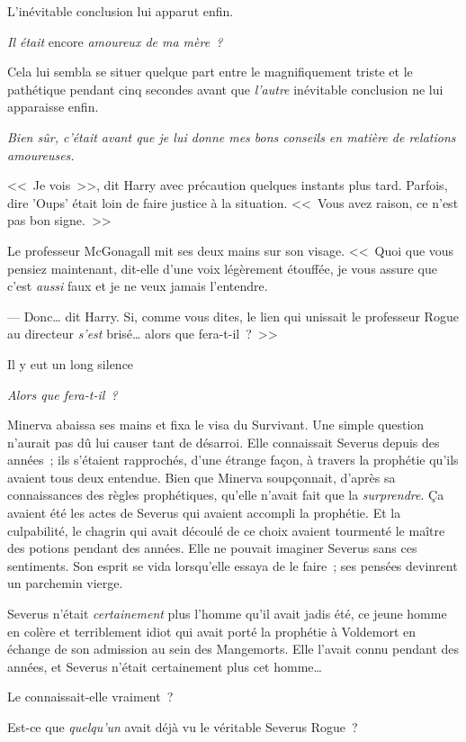L'inévitable conclusion lui apparut enfin.

\emph{Il était} encore \emph{amoureux de ma mère~?}

Cela lui sembla se situer quelque part entre le magnifiquement triste et le pathétique pendant cinq secondes avant que \emph{l'autre} inévitable conclusion ne lui apparaisse enfin.

\emph{Bien sûr, c'était avant que je lui donne mes bons conseils en matière de relations amoureuses.}

<<~Je vois~>>, dit Harry avec précaution quelques instants plus tard. Parfois, dire 'Oups' était loin de faire justice à la situation. <<~Vous avez raison, ce n'est pas bon signe.~>>

Le professeur McGonagall mit ses deux mains sur son visage. <<~Quoi que vous pensiez maintenant, dit-elle d'une voix légèrement étouffée, je vous assure que c'est \emph{aussi} faux et je ne veux jamais l'entendre.

--- Donc… dit Harry. Si, comme vous dites, le lien qui unissait le professeur Rogue au directeur \emph{s'est} brisé… alors que fera-t-il~?~>>

Il y eut un long silence

\later

\emph{Alors que fera-t-il~?}

Minerva abaissa ses mains et fixa le visa du Survivant. Une simple question n'aurait pas dû lui causer tant de désarroi. Elle connaissait Severus depuis des années~; ils s'étaient rapprochés, d'une étrange façon, à travers la prophétie qu'ils avaient tous deux entendue. Bien que Minerva soupçonnait, d'après sa connaissances des règles prophétiques, qu'elle n'avait fait que la \emph{surprendre}. Ça avaient été les actes de Severus qui avaient accompli la prophétie. Et la culpabilité, le chagrin qui avait découlé de ce choix avaient tourmenté le maître des potions pendant des années. Elle ne pouvait imaginer Severus sans ces sentiments. Son esprit se vida lorsqu'elle essaya de le faire~; ses pensées devinrent un parchemin vierge.

Severus n'était \emph{certainement} plus l'homme qu'il avait jadis été, ce jeune homme en colère et terriblement idiot qui avait porté la prophétie à Voldemort en échange de son admission au sein des Mangemorts. Elle l'avait connu pendant des années, et Severus n'était certainement plus cet homme…

Le connaissait-elle vraiment~?

Est-ce que \emph{quelqu'un} avait déjà vu le véritable Severus Rogue~?

